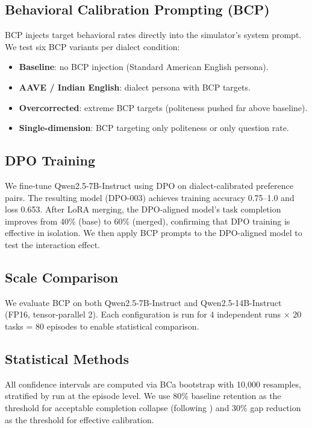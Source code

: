 \documentclass[11pt,a4paper]{article}
\begin{document}
\subsection{Behavioral Calibration Prompting (BCP)}

BCP injects target behavioral rates directly into the simulator's system prompt.
We test six BCP variants per dialect condition:
\begin{itemize}
    \item \textbf{Baseline}: no BCP injection (Standard American English persona).
    \item \textbf{AAVE / Indian English}: dialect persona with BCP targets.
    \item \textbf{Overcorrected}: extreme BCP targets (politeness pushed far above baseline).
    \item \textbf{Single-dimension}: BCP targeting only politeness or only question rate.
\end{itemize}

\subsection{DPO Training}

We fine-tune Qwen2.5-7B-Instruct using DPO \citep{rafailov2023dpo} on dialect-calibrated preference pairs.
The resulting model (DPO-003) achieves training accuracy 0.75--1.0 and loss 0.653.
After LoRA merging, the DPO-aligned model's task completion improves from 40\% (base) to 60\% (merged), confirming that DPO training is effective in isolation.
We then apply BCP prompts to the DPO-aligned model to test the interaction effect.

\subsection{Scale Comparison}

We evaluate BCP on both Qwen2.5-7B-Instruct and Qwen2.5-14B-Instruct (FP16, tensor-parallel 2).
Each configuration is run for 4 independent runs $\times$ 20 tasks = 80 episodes to enable statistical comparison.

\subsection{Statistical Methods}

All confidence intervals are computed via BCa bootstrap with 10,000 resamples, stratified by run at the episode level.
We use 80\% baseline retention as the threshold for acceptable completion collapse (following \citealt{basil2025playing_pretend}) and 30\% gap reduction as the threshold for effective calibration.
\end{document}
